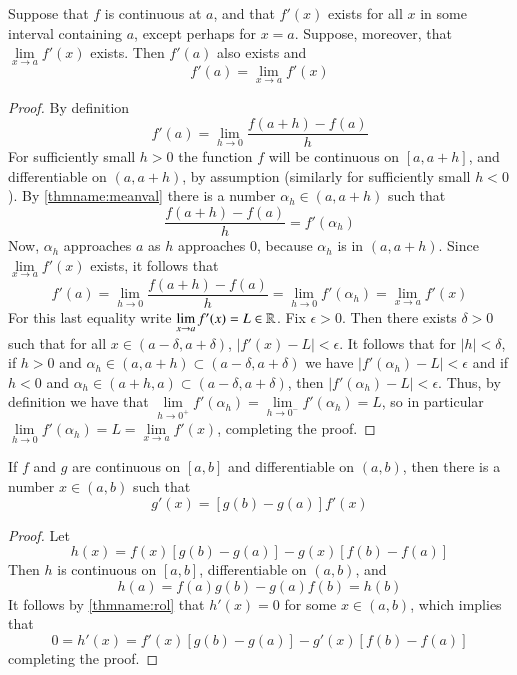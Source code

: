 \documentclass[12pt, a4paper, oneside, openright, titlepage]{book}
\begin{document}
\begin{thm}
    Suppose that $f$ is continuous at $a$, and that $f'(x)$ exists for all $x$ in some interval containing $a$, except perhaps for $x = a$. Suppose, moreover, that $\lim\limits_{x\rightarrow a}f'(x)$ exists. Then $f'(a)$ also exists and \begin{equation}
        f'(a) = \lim\limits_{x\rightarrow a}f'(x)
    \end{equation}
\end{thm}
\begin{proof}
    By definition \begin{equation*}
        f'(a) = \lim\limits_{h\rightarrow 0}\frac{f(a+h) - f(a)}{h}
    \end{equation*}
    For sufficiently small $h > 0$ the function $f$ will be continuous on $[a,a+h]$, and differentiable on $(a,a+h)$, by assumption (similarly for sufficiently small $h < 0$). By \ref{thmname:meanval} there is a number $\alpha_h \in (a,a+h)$ such that $$\frac{f(a+h) - f(a)}{h} = f'(\alpha_h)$$
    Now, $\alpha_h$ approaches $a$ as $h$ approaches $0$, because $\alpha_h$ is in $(a,a+h)$. Since $\lim\limits_{x\rightarrow a}f'(x)$ exists, it follows that $$f'(a) = \lim\limits_{h\rightarrow 0}\frac{f(a+h) - f(a)}{h} = \lim\limits_{h\rightarrow 0}f'(\alpha_h) = \lim\limits_{x\rightarrow a}f'(x)$$
    For this last equality write $\lim\limits_{x\rightarrow a}f'(x) = L \in \mathbb R$. Fix $\epsilon > 0$. Then there exists $\delta > 0$ such that for all $x \in (a-\delta, a+\delta)$, $|f'(x) - L| < \epsilon$. It follows that for $|h| < \delta$, if $h > 0$ and $\alpha_h \in (a,a+h) \subset (a-\delta,a+\delta)$ we have $|f'(\alpha_h) - L| < \epsilon$ and if $h < 0$ and $\alpha_h \in (a+h, a) \subset (a-\delta,a+\delta)$, then $|f'(\alpha_h) - L| < \epsilon$. Thus, by definition we have that $\lim\limits_{h\rightarrow 0^+}f'(\alpha_h) = \lim\limits_{h\rightarrow 0^-}f'(\alpha_h) = L$, so in particular $\lim\limits_{h\rightarrow 0}f'(\alpha_h) = L = \lim\limits_{x\rightarrow a}f'(x)$, completing the proof.
\end{proof}


\begin{namthm}\label{thmname:caumeanval}
    If $f$ and $g$ are continuous on $[a,b]$ and differentiable on $(a,b)$, then there is a number $x \in (a,b)$ such that \begin{equation}
        [f(b) - f(a)]g'(x) = [g(b) - g(a)]f'(x)
    \end{equation}
\end{namthm}
\begin{proof}
    Let $$h(x) = f(x)[g(b) - g(a)] - g(x)[f(b)-f(a)]$$
    Then $h$ is continuous on $[a,b]$, differentiable on $(a,b)$, and $$h(a) = f(a)g(b) - g(a)f(b) = h(b)$$
    It follows by \ref{thmname:rol} that $h'(x) = 0$ for some $x \in (a,b)$, which implies that \begin{equation*}
        0 = h'(x) = f'(x)[g(b)-g(a)] - g'(x)[f(b) - f(a)]
    \end{equation*}
    completing the proof.
\end{proof}
\end{document}
